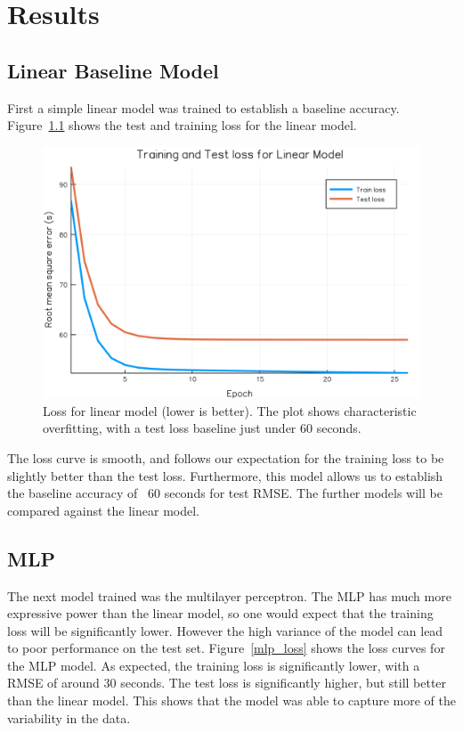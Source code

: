\chapter{Results}

\section{Linear Baseline Model}

First a simple linear model was trained to establish a baseline accuracy.
Figure~\ref{linear_loss} shows the test and training loss for the linear model.

\begin{figure}
\includegraphics[width=\linewidth]{images/linear_loss.png}
\caption{Loss for linear model (lower is better). The plot shows characteristic overfitting, with a test loss baseline just under 60 seconds.}
\label{linear_loss}
\end{figure}
\clearpage
\newpage

The loss curve is smooth, and follows our expectation for the training loss to be slightly better than the test loss.
Furthermore, this model allows us to establish the baseline accuracy of ~60 seconds for test RMSE.
The further models will be compared against the linear model.

\section{MLP}

The next model trained was the multilayer perceptron.
The MLP has much more expressive power than the linear model, so one would expect that the training loss will be significantly lower.
However the high variance of the model can lead to poor performance on the test set.
Figure~\ref{mlp_loss} shows the loss curves for the MLP model.
As expected, the training loss is significantly lower, with a RMSE of around 30 seconds.
The test loss is significantly higher, but still better than the linear model.
This shows that the model was able to capture more of the variability in the data.

